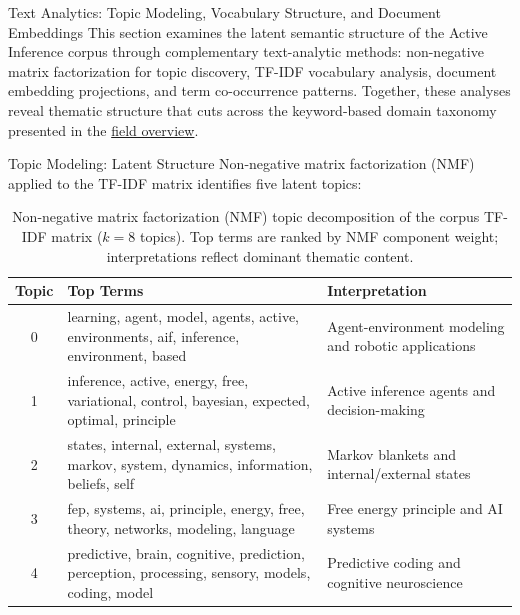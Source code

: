\documentclass[
  ignorenonframetext,
]{beamer}
\author{\texorpdfstring{}{}}
\date{}
\begin{document}
\begin{frame}
\begin{block}{Text Analytics: Topic Modeling, Vocabulary Structure, and
Document Embeddings \label{sec:text_analytics}}
\protect{}\label{text-analytics-topic-modeling-vocabulary-structure-and-document-embeddings}
This section examines the latent semantic structure of the Active
Inference corpus through complementary text-analytic methods:
non-negative matrix factorization for topic discovery, TF-IDF vocabulary
analysis, document embedding projections, and term co-occurrence
patterns. Together, these analyses reveal thematic structure that cuts
across the keyword-based domain taxonomy presented in the
\hyperref[sec:field_overview]{field overview}.
\end{block}

\begin{block}{Topic Modeling: Latent Structure}
\protect{}\label{topic-modeling-latent-structure}
Non-negative matrix factorization (NMF) applied to the TF-IDF matrix
identifies five latent topics:

\begin{table}[htbp]
\centering
\caption{Non-negative matrix factorization (NMF) topic decomposition of the corpus TF-IDF matrix ($k = 8$ topics). Top terms are ranked by NMF component weight; interpretations reflect dominant thematic content.}
\label{tab:nmf_topics}
\begin{tabular}{clp{6cm}}
\toprule
\textbf{Topic} & \textbf{Top Terms} & \textbf{Interpretation} \\
\midrule
0 & learning, agent, model, agents, active, environments, aif, inference, environment, based & Agent-environment modeling and robotic applications \\
1 & inference, active, energy, free, variational, control, bayesian, expected, optimal, principle & Active inference agents and decision-making \\
2 & states, internal, external, systems, markov, system, dynamics, information, beliefs, self & Markov blankets and internal/external states \\
3 & fep, systems, ai, principle, energy, free, theory, networks, modeling, language & Free energy principle and AI systems \\
4 & predictive, brain, cognitive, prediction, perception, processing, sensory, models, coding, model & Predictive coding and cognitive neuroscience \\
\bottomrule
\end{tabular}
\end{table}


\end{block}
\end{frame}
\end{document}

